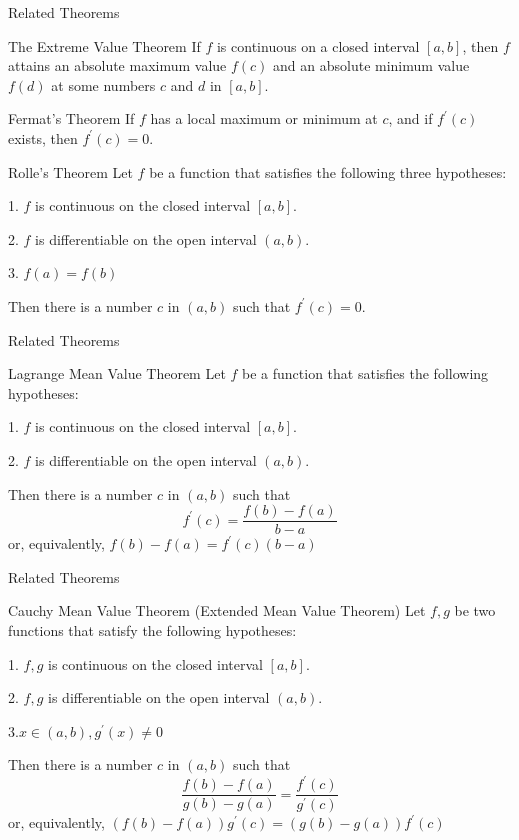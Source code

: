 \begin{frame}{Related Theorems}
    \begin{block}{The Extreme Value Theorem}
        If $f$ is continuous on a closed interval $[a, b]$, then $f$ attains an absolute maximum value $f(c)$ and an absolute minimum value $f(d)$ at some numbers $c$ and $d$ in $[a, b]$.
    \end{block}
    \begin{block}{Fermat's Theorem}
        If $f$ has a local maximum or minimum at $c$, and if $f^{\prime}(c)$ exists, then $f^{\prime}(c)=0$.
    \end{block}
    \begin{block}{Rolle's Theorem}
        Let $f$ be a function that satisfies the following three hypotheses:

        1. $f$ is continuous on the closed interval $[a, b]$.

        2. $f$ is differentiable on the open interval $(a, b)$.

        3. $f(a)=f(b)$

        Then there is a number $c$ in $(a, b)$ such that $f^{\prime}(c)=0$.
    \end{block}
\end{frame}


\begin{frame}{Related Theorems}
    \begin{block}{Lagrange Mean Value Theorem }
        Let $f$ be a function that satisfies the following hypotheses:

        1. $f$ is continuous on the closed interval $[a, b]$.

        2. $f$ is differentiable on the open interval $(a, b)$.

        Then there is a number $c$ in $(a, b)$ such that
        $$
            f^{\prime}(c)=\frac{f(b)-f(a)}{b-a}
        $$
        or, equivalently,
        $f(b)-f(a)=f^{\prime}(c)(b-a)$
    \end{block}
\end{frame}


\begin{frame}{Related Theorems}
    \begin{block}{Cauchy Mean Value Theorem (Extended Mean Value Theorem) }
        Let $f,g$ be two functions that satisfy the following hypotheses:

        1. $f,g$ is continuous on the closed interval $[a, b]$.

        2. $f,g$ is differentiable on the open interval $(a, b)$.

        3.$x \in(a, b), g^{\prime}(x) \neq 0$

        Then there is a number $c$ in $(a, b)$ such that
        $$
            \frac{f(b)-f(a)}{g(b)-g(a)}=\frac{f^{\prime}(c)}{g^{\prime}(c)}
        $$
        or, equivalently,
        $(f(b)-f(a)) g^{\prime}(c)=(g(b)-g(a)) f^{\prime}(c)$
    \end{block}
\end{frame}



